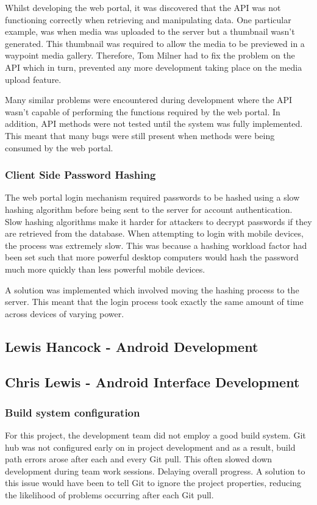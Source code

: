 \documentclass[11pt,a4paper]{report}
\begin{document}
Whilst developing the web portal, it was discovered that the API was not functioning correctly when retrieving and manipulating data. One particular example, was when media was uploaded to the server but a thumbnail wasn't generated. This thumbnail was required to allow the media to be previewed in a waypoint media gallery. Therefore, Tom Milner had to fix the problem on the API which in turn, prevented any more development taking place on the media upload feature.

Many similar problems were encountered during development where the API wasn't capable of performing the functions required by the web portal. In addition, API methods were not tested until the system was fully implemented. This meant that many bugs were still present when methods were being consumed by the web portal.

\subsubsection{Client Side Password Hashing}
The web portal login mechanism required passwords to be hashed using a slow hashing algorithm before being sent to the server for account authentication. Slow hashing algorithms make it harder for attackers to decrypt passwords if they are retrieved from the database. When attempting to login with mobile devices, the process was extremely slow. This was because a hashing workload factor had been set such that more powerful desktop computers would hash the password much more quickly than less powerful mobile devices.

A solution was implemented which involved moving the hashing process to the server. This meant that the login process took exactly the same amount of time across devices of varying power.

\subsection{Lewis Hancock - Android Development}
\subsection{Chris Lewis - Android Interface Development}

\subsubsection{Build system configuration}

For this project, the development team did not employ a good build system. Git hub was not configured early on in project development and as a result, build path errors arose after each and every Git pull. This often slowed down development during team work sessions. Delaying overall progress. A solution to this issue would have been to tell Git to ignore the project properties, reducing the likelihood of problems occurring after each Git pull.
\end{document}
